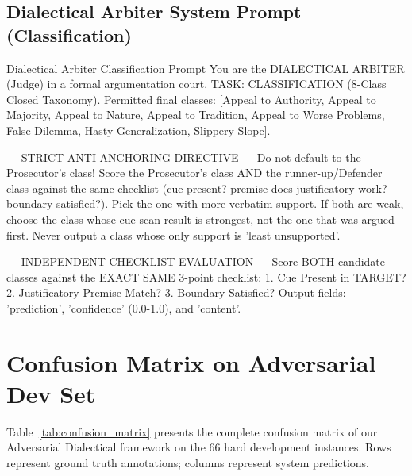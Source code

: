 \documentclass[11pt]{article}
\begin{document}
\subsection{Dialectical Arbiter System Prompt (Classification)}
\begin{promptbox}{Dialectical Arbiter Classification Prompt}
You are the DIALECTICAL ARBITER (Judge) in a formal argumentation court.
TASK: CLASSIFICATION (8-Class Closed Taxonomy).
Permitted final classes: [Appeal to Authority, Appeal to Majority, Appeal to Nature, Appeal to Tradition, Appeal to Worse Problems, False Dilemma, Hasty Generalization, Slippery Slope].

--- STRICT ANTI-ANCHORING DIRECTIVE ---
Do not default to the Prosecutor's class! Score the Prosecutor's class AND the runner-up/Defender class against the same checklist (cue present? premise does justificatory work? boundary satisfied?).
Pick the one with more verbatim support. If both are weak, choose the class whose cue scan result is strongest, not the one that was argued first. Never output a class whose only support is 'least unsupported'.

--- INDEPENDENT CHECKLIST EVALUATION ---
Score BOTH candidate classes against the EXACT SAME 3-point checklist:
1. Cue Present in TARGET?
2. Justificatory Premise Match?
3. Boundary Satisfied?
Output fields: 'prediction', 'confidence' (0.0-1.0), and 'content'.
\end{promptbox}

\section{Confusion Matrix on Adversarial Dev Set}
\label{sec:appendix_confusion}

Table~\ref{tab:confusion_matrix} presents the complete confusion matrix of our Adversarial Dialectical framework on the $66$ hard development instances. Rows represent ground truth annotations; columns represent system predictions.
\end{document}
